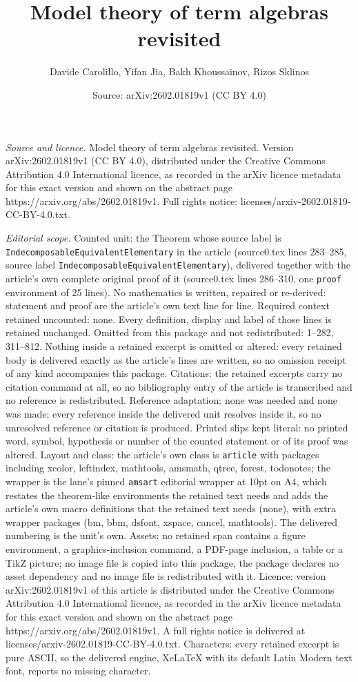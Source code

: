 \documentclass[10pt,a4paper]{amsart}
\title[Model theory of term algebras revisited]{Model theory of term algebras revisited}
\author{Davide Carolillo, Yifan Jia, Bakh Khoussainov, Rizos Sklinos}
\date{Source: arXiv:2602.01819v1 (CC BY 4.0)}
\begin{document}
\maketitle

\noindent\emph{Source and licence.} Model theory of term algebras revisited. Version arXiv:2602.01819v1 (CC BY 4.0), distributed under the Creative Commons Attribution 4.0 International licence, as recorded in the arXiv licence metadata for this exact version and shown on the abstract page https://arxiv.org/abs/2602.01819v1. Full rights notice: licenses/arxiv-2602.01819-CC-BY-4.0.txt.\par\smallskip

\noindent\textit{Editorial scope.} Counted unit: the Theorem whose source label is \texttt{IndecomposableEquivalentElementary} in the article (source0.tex lines 283--285, source label \texttt{IndecomposableEquivalentElementary}), delivered together with the article's own complete original proof of it (source0.tex lines 286--310, one \texttt{proof} environment of 25 lines). No mathematics is written, repaired or re-derived: statement and proof are the article's own text line for line. Required context retained uncounted: none. Every definition, display and label of those lines is retained unchanged. Omitted from this package and not redistributed: 1--282, 311--812. Nothing inside a retained excerpt is omitted or altered: every retained body is delivered exactly as the article's lines are written, so no omission receipt of any kind accompanies this package. Citations: the retained excerpts carry no citation command at all, so no bibliography entry of the article is transcribed and no reference is redistributed. Reference adaptation: none was needed and none was made; every reference inside the delivered unit resolves inside it, so no unresolved reference or citation is produced. Printed slips kept literal: no printed word, symbol, hypothesis or number of the counted statement or of its proof was altered. Layout and class: the article's own class is \texttt{article} with packages including xcolor, leftindex, mathtools, amsmath, qtree, forest, todonotes; the wrapper is the lane's pinned \texttt{amsart} editorial wrapper at 10pt on A4, which restates the theorem-like environments the retained text needs and adds the article's own macro definitions that the retained text needs (none), with extra wrapper packages (bm, bbm, dsfont, xspace, cancel, mathtools). The delivered numbering is the unit's own. Assets: no retained span contains a figure environment, a graphics-inclusion command, a PDF-page inclusion, a table or a TikZ picture; no image file is copied into this package, the package declares no asset dependency and no image file is redistributed with it. Licence: version arXiv:2602.01819v1 of this article is distributed under the Creative Commons Attribution 4.0 International licence, as recorded in the arXiv licence metadata for this exact version and shown on the abstract page https://arxiv.org/abs/2602.01819v1. A full rights notice is delivered at licenses/arxiv-2602.01819-CC-BY-4.0.txt. Characters: every retained excerpt is pure ASCII, so the delivered engine, XeLaTeX with its default Latin Modern text font, reports no missing character.
\end{document}
